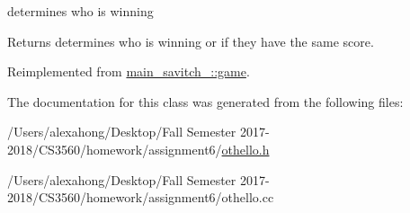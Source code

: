 determines who is winning 

\begin{DoxyReturn}{Returns}
determines who is winning or if they have the same score. 
\end{DoxyReturn}


Reimplemented from \hyperlink{classmain__savitch__14_1_1game_a2f0d5338c12bd98d52fe2383ece5c45e}{main\+\_\+savitch\+\_\+::game}.



The documentation for this class was generated from the following files\+:\begin{DoxyCompactItemize}
\item 
/\+Users/alexahong/\+Desktop/\+Fall Semester 2017-\/2018/\+C\+S3560/homework/assignment6/\hyperlink{othello_8h}{othello.\+h}\item 
/\+Users/alexahong/\+Desktop/\+Fall Semester 2017-\/2018/\+C\+S3560/homework/assignment6/othello.\+cc\end{DoxyCompactItemize}
